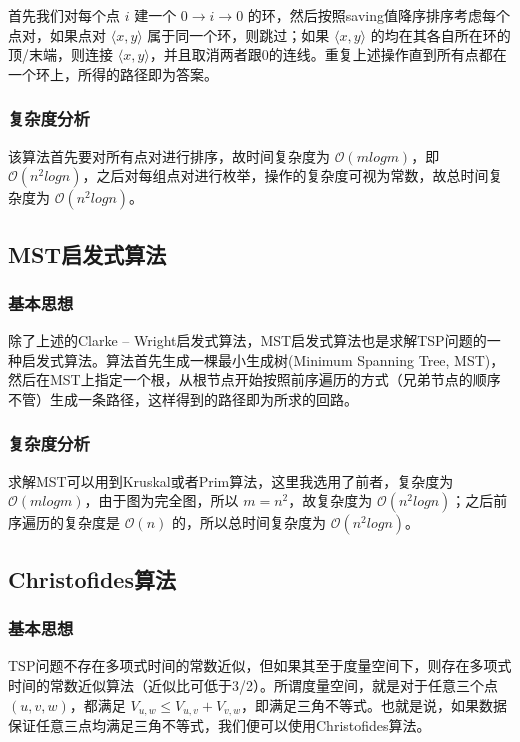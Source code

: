 \documentclass[lang=cn,11pt,a4paper]{elegantpaper}
\begin{document}
首先我们对每个点 $i$ 建一个 $0\rightarrow i\rightarrow0$ 的环，然后按照saving值降序排序考虑每个点对，如果点对 $\langle x, y\rangle$ 属于同一个环，则跳过；如果 $\langle x, y\rangle$ 的均在其各自所在环的顶/末端，则连接 $\langle x, y\rangle$，并且取消两者跟0的连线。重复上述操作直到所有点都在一个环上，所得的路径即为答案。

\subsubsection{复杂度分析}
该算法首先要对所有点对进行排序，故时间复杂度为 $\mathcal{O}\left(mlog{m}\right)$，即$\mathcal{O}\left(n^2log{n}\right)$，之后对每组点对进行枚举，操作的复杂度可视为常数，故总时间复杂度为 $\mathcal{O}\left(n^2log{n}\right)$。


\subsection{MST启发式算法}
\subsubsection{基本思想}
除了上述的Clarke – Wright启发式算法，MST启发式算法也是求解TSP问题的一种启发式算法。算法首先生成一棵最小生成树(Minimum Spanning Tree, MST)，然后在MST上指定一个根，从根节点开始按照前序遍历的方式（兄弟节点的顺序不管）生成一条路径，这样得到的路径即为所求的回路。

\subsubsection{复杂度分析}
求解MST可以用到Kruskal或者Prim算法，这里我选用了前者，复杂度为 $\mathcal{O}\left(mlog{m}\right)$，由于图为完全图，所以 $m=n^2$，故复杂度为 $\mathcal{O}\left(n^2log{n}\right)$；之后前序遍历的复杂度是 $\mathcal{O}\left(n\right)$ 的，所以总时间复杂度为 $\mathcal{O}\left(n^2log{n}\right)$。


\subsection{Christofides算法}
\subsubsection{基本思想}
TSP问题不存在多项式时间的常数近似，但如果其至于度量空间下，则存在多项式时间的常数近似算法（近似比可低于3/2）。所谓度量空间，就是对于任意三个点 $(u, v, w)$，都满足 $V_{u,w}\le V_{u,v}+V_{v,w}$，即满足三角不等式。也就是说，如果数据保证任意三点均满足三角不等式，我们便可以使用Christofides算法。
\end{document}
